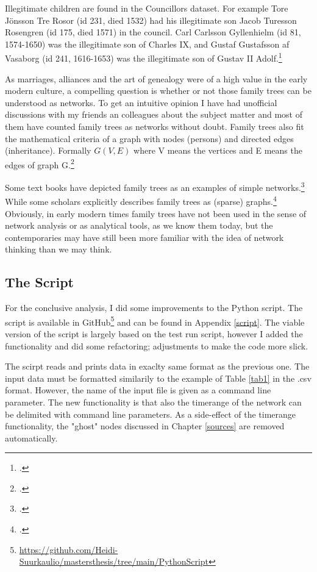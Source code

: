 Illegitimate children are found in the Councillors dataset. For example Tore Jönsson Tre Rosor (id 231, died 1532) had his illegitimate son Jacob Turesson Rosengren (id 175, died 1571) in the council. Carl Carlsson Gyllenhielm (id 81, 1574-1650) was the illegitimate son of Charles IX, and Gustaf Gustafsson af Vasaborg (id 241, 1616-1653) was the illegitimate son of Gustav II Adolf.\footcite{councillorsDS}

As marriages, alliances and the art of genealogy were of a high value in the early modern culture, a compelling question is whether or not those family trees can be understood as networks. To get an intuitive opinion I have had unofficial discussions with my friends an colleagues about the subject matter and most of them have counted family trees as networks without doubt. Family trees also fit the mathematical criteria of a graph with nodes (persons) and directed edges (inheritance). Formally $G(V,E)$ where V means the vertices and E means the edges of graph G.\footcite[p. vii]{RajPM2018a}

Some text books have depicted family trees as an examples of simple networks.\footcite[See e. g.][p. 247.]{huhtamakiEtAl} While some scholars explicitly describes family trees as (sparse) graphs.\footcite{batagelj} Obviously, in early modern times family trees have not been used in the sense of network analysis or as analytical tools, as we know them today, but the contemporaries may have still been more familiar with the idea of network thinking than we may think.

\subsection{The Script}
For the conclusive analysis, I did some improvements to the Python script. The script is available in GitHub\footnote{\url{https://github.com/Heidi-Suurkaulio/mastersthesis/tree/main/PythonScript}} and can be found in Appendix \ref{script}. The viable version of the script is largely based on the test run script, however I added the functionality and did some refactoring; adjustments to make the code more slick. 

The scirpt reads and prints data in exaclty same format as the previous one. The input data must be formatted similarily to the example of Table \ref{tab1} in the .csv format. However, the name of the input file is given as a command line parameter. The new functionality is that also the timerange of the network can be delimited with command line parameters. As a side-effect of the timerange functionality, the "ghost" nodes discussed in Chapter \ref{sources} are removed automatically.


